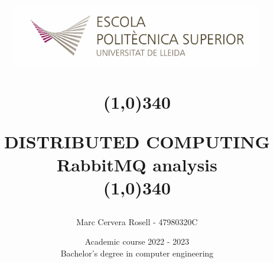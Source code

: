 \title{
	\begin{center}
	\vspace{3cm}
	\includegraphics[width=11cm, height=3cm]{Images/Logo-nou-eps.jpg}
	\end{center}
	\begin{center}
	\line(1,0){340}
	\end{center}		
	DISTRIBUTED COMPUTING\\
	\vspace{2mm}
	\Large RabbitMQ analysis \\
	\line(1,0){340}
	\vspace{2.5cm}
	}

\author{Marc Cervera Rosell - 47980320C \vspace{1cm}}


\date{Academic course 2022 - 2023\vspace{0.5cm} \\Bachelor's degree in computer engineering}